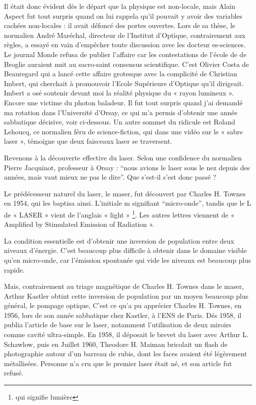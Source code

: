 \documentclass[a4paper,12pt]{article}
\begin{document}
Il était donc évident dès le départ que la physique est non-locale, mais Alain Aspect fut tout surpris quand on lui rappela qu'il pouvait y avoir des variables cachées non-locales : il avait défoncé des portes ouvertes. Lors de sa thèse, le normalien André Maréchal, directeur de l'Institut d'Optique, contrairement aux règles, a essayé en vain d'empêcher toute discussion avec les docteur es-sciences. Le journal Monde refusa de publier l'affaire car les contestations de l'école de de Broglie auraient nuit au sacro-saint consensus scientifique. C'est Olivier Costa de Beauregard qui a lancé cette affaire grotesque avec la complicité de Christian Imbert, qui cherchait à promouvoir l'Ecole Supérieure d'Optique qu'il dirigeait. Imbert a osé soutenir devant moi la réalité physique du « rayon lumineux ». Encore une victime du photon baladeur. Il fut tout surpris quand j'ai demandé ma rotation dans l'Université d'Orsay, ce qui m'a permis d'obtenir une année sabbatique décisive, voir ci-dessous. Un autre sommet du ridicule est Roland Lehoucq, ce normalien féru de science-fiction, qui dans une vidéo sur le « sabre laser », témoigne que deux faisceaux laser se traversent.

Revenons à la découverte effective du laser. Selon une confidence du normalien  Pierre Jacquinot, professeur à Orsay : ``nous avions le laser sous le nez depuis des années, mais vaut mieux ne pas le dire''. Que s'est-il s'est donc passé ?

Le prédécesseur naturel du laser, le maser, fut découvert par Charles H. Townes en 1954, qui les baptisa ainsi. L'initiale m signifiant ``micro-onde'', tandis que le L de « LASER » vient de l'anglais « light » \footnote{qui signifie lumière}. Les autres lettres viennent de « Amplified by Stimulated Emission of Radiation ». 

La condition essentielle est d'obtenir une inversion de population entre deux niveaux d'énergie. C'est beaucoup plus difficile à obtenir dans le domaine visible qu'en micro-onde, car l'émission spontanée qui vide les niveaux est beaucoup plus rapide. 

Mais, contrairement au triage magnétique de Charles H. Townes dans le maser, Arthur Kastler obtint cette inversion de population par un moyen beaucoup plus général, le pompage optique,  C'est ce qu'a pu apprécier Charles H. Townes, en 1956, lors de son année sabbatique  chez Kastler, à l'ENS de Paris. Dés 1958, il publia l'article de base sur le laser, notamment l'utilisation de deux miroirs comme cavité ultra-simple. En 1958, il déposait le brevet du laser avec Arthur L. Schawlow, puis en Juillet 1960, Theodore H. Maiman bricolait un flash de photographie autour d'un barreau de rubis, dont les faces avaient été légèrement métallisées. Personne n'a cru que le premier laser était né, et son article fut refusé. 
\end{document}
